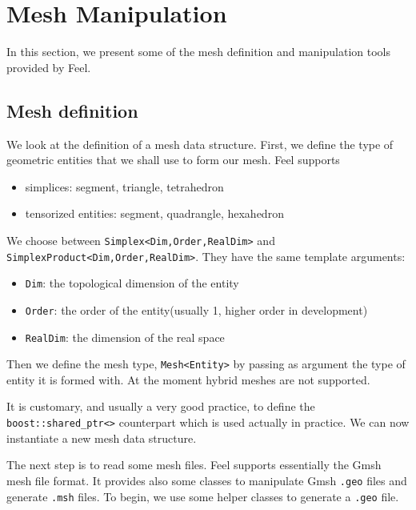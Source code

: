 \documentclass[a4paper]{book}
\newcommand{\feel}{Feel\xspace}
\begin{document}
\section{Mesh Manipulation}
\label{sec:mesh-manipulation}

In this section, we present some of the mesh definition and
manipulation tools provided by \feel.

\subsection{Mesh definition}

We look at the definition of a mesh data structure. First, we define
the type of geometric entities that we shall use to form our mesh. \feel supports
\begin{itemize}
\item simplices: segment, triangle, tetrahedron
\item tensorized entities: segment, quadrangle, hexahedron
\end{itemize}

We choose between \lstinline!Simplex<Dim,Order,RealDim>!  and
\lstinline!SimplexProduct<Dim,Order,RealDim>!. They have the same
template arguments:
\begin{itemize}
\item \lstinline!Dim!: the topological dimension of the entity
\item \lstinline!Order!: the order of the entity(usually 1, higher order in development)
\item \lstinline!RealDim!: the dimension of the real space
\end{itemize}




Then we define the mesh type, \lstinline!Mesh<Entity>! by passing as
argument the type of entity it is formed with. At the moment hybrid
meshes are not supported.



It is customary, and usually a very good practice, to define the
\lstinline!boost::shared_ptr<>!  counterpart which is used actually in
practice. We can now instantiate a new mesh data structure.



The next step is to read some mesh files. \feel supports essentially
the Gmsh mesh file format. It provides also some classes to manipulate
Gmsh \lstinline!.geo! files and generate \lstinline!.msh! files. To
begin, we use some helper classes to generate a \lstinline!.geo! file.
\end{document}
